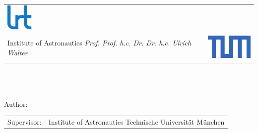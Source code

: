 \begin{titlepage}


	\begin{table}[ht!]
		\begin{tabularx}{\linewidth}{XX}
		\flushleft
		\includegraphics[height=13mm]{resources/tex/titlepage/images/Logo_LRT_neu_voll_A4.pdf}\\[3pt]
		{\small
		Institute of Astronautics\newline
		\textit{
		Prof. Prof. h.c. Dr. Dr. h.c.\newline
		Ulrich Walter}}
		&
		\flushright
		\includegraphics[height=13mm]{resources/tex/titlepage/images/TUM.pdf}
		\end{tabularx}
	\end{table}
	
	\vspace{30pt}
	
	\begin{center}
	{\fontsize{16}{16}\selectfont\bfseries
	\thesistype\\[8pt]
	\mytitle\\[12pt]}
	{\fontsize{16}{16}\selectfont
	\thesisnumber\\[8pt]
	Author:\\[8pt]
	\theauthor}
	\end{center}
	
	\begin{table}[b!]
		\begin{tabularx}{\linewidth}{p{4.2cm} X}
		Supervisor:
		&
		\supervisor\newline
		Institute of Astronautics\newline
		Technische Universität München
		\end{tabularx}
	\end{table}

\end{titlepage}
\restoregeometry
